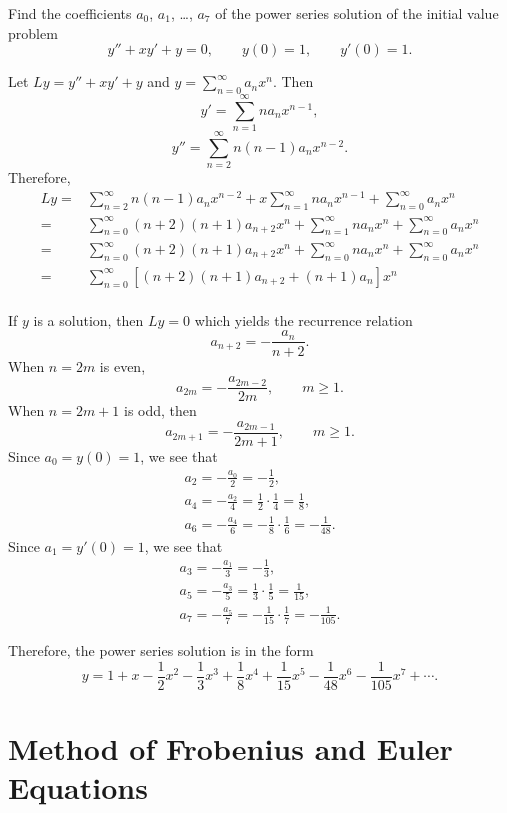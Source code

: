 \begin{exercise}
  Find the coefficients $a_0$, $a_1$, \dots, $a_7$ of the power series solution of the initial value problem
  \[y'' + xy'+ y =0, \qquad y(0)=1,\qquad y'(0)=1.\]
\end{exercise}
\begin{exersol}
Let $Ly=y'' + xy'+ y$ and $y=\sum\limits_{n=0}^\infty a_nx^n$. Then
\[y'=\sum_{n=1}^\infty na_nx^{n-1},\]
\[y''=\sum_{n=2}^\infty n(n-1) a_n x^{n-2}.\]
Therefore,
\[
\begin{aligned}
  Ly
  =&\sum_{n=2}^\infty n(n-1) a_n x^{n-2} + x\sum_{n=1}^\infty na_nx^{n-1} + \sum\limits_{n=0}^\infty a_nx^n\\
  =&\sum_{n=0}^\infty (n+2)(n+1) a_{n+2} x^n + \sum_{n=1}^\infty na_nx^{n} + \sum\limits_{n=0}^\infty a_nx^n\\
  =&\sum_{n=0}^\infty (n+2)(n+1) a_{n+2} x^n + \sum_{n=0}^\infty na_nx^n + \sum\limits_{n=0}^\infty a_nx^n\\
  =&\sum_{n=0}^\infty [(n+2)(n+1)a_{n+2}+(n+1)a_n]x^n\\
\end{aligned}  
\]

If $y$ is a solution, then $Ly=0$ which yields the recurrence relation
\[a_{n+2}=-\frac{a_n}{n+2}.\]
When $n=2m$ is even,
\[a_{2m}=-\frac{a_{2m-2}}{2m},\qquad m\ge 1.\]
When $n=2m+1$ is odd, then
\[a_{2m+1}=-\frac{a_{2m-1}}{2m+1},\qquad m\ge 1.\]
Since $a_0=y(0)=1$, we see that
\[
  \begin{aligned}
    a_2=-\frac{a_0}{2}=-\frac12,\\
    a_4=-\frac{a_2}{4}=\frac12\cdot \frac14=\frac{1}{8},\\
    a_6=-\frac{a_4}{6}=-\frac18\cdot \frac16=-\frac{1}{48}.
  \end{aligned}
\]
Since $a_1=y'(0)=1$, we see that
\[
  \begin{aligned}
    a_3=-\frac{a_1}{3}=-\frac13,\\
    a_5=-\frac{a_3}{5}=\frac13\cdot \frac15=\frac{1}{15},\\
    a_7=-\frac{a_5}{7}=-\frac{1}{15}\cdot \frac17=-\frac{1}{105}.
  \end{aligned}
\]

Therefore, the power series solution is in the form
\[y = 1 + x - \frac{1}{2} x^2-\frac{1}{3} x^3 + \frac{1}{8} x^4 +\frac{1}{15}x^5 - \frac{1}{48} x^6-\frac{1}{105}x^7 + \cdots.\]
\end{exersol}

\section{Method of Frobenius and Euler Equations}

